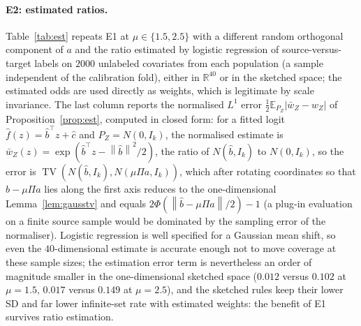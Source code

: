 \documentclass[11pt,a4paper]{article}
\newcommand{\norm}[1]{\left\|#1\right\|}
\newcommand{\E}{\mathbb{E}}
\newcommand{\R}{\mathbb{R}}
\newcommand{\TV}{\operatorname{TV}}
\theoremstyle{plain}
\theoremstyle{definition}
\theoremstyle{remark}
\begin{document}
\FloatBarrier
\paragraph{E2: estimated ratios.}
Table~\ref{tab:est} repeats E1 at $\mu\in\{1.5,2.5\}$ with a different random orthogonal component of $a$ and the ratio estimated by logistic regression of source-versus-target labels on $2000$ unlabeled covariates from each population (a sample independent of the calibration fold), either in $\R^{40}$ or in the sketched space; the estimated odds are used directly as weights, which is legitimate by scale invariance. The last column reports the normalised $L^1$ error $\tfrac12\E_{P_Z}|\bar w_Z-w_Z|$ of Proposition~\ref{prop:est}, computed in closed form: for a fitted logit $\hat f(z)=\hat b^{\!\top}z+\hat c$ and $P_Z=N(0,I_k)$, the normalised estimate is $\bar w_Z(z)=\exp(\hat b^{\!\top}z-\norm{\hat b}^2/2)$, the ratio of $N(\hat b,I_k)$ to $N(0,I_k)$, so the error is $\TV(N(\hat b,I_k),N(\mu\Pi a,I_k))$, which after rotating coordinates so that $\hat b-\mu\Pi a$ lies along the first axis reduces to the one-dimensional Lemma~\ref{lem:gausstv} and equals $2\Phi(\norm{\hat b-\mu\Pi a}/2)-1$ (a plug-in evaluation on a finite source sample would be dominated by the sampling error of the normaliser). Logistic regression is well specified for a Gaussian mean shift, so even the $40$-dimensional estimate is accurate enough not to move coverage at these sample sizes; the estimation error term is nevertheless an order of magnitude smaller in the one-dimensional sketched space ($0.012$ versus $0.102$ at $\mu=1.5$, $0.017$ versus $0.149$ at $\mu=2.5$), and the sketched rules keep their lower SD and far lower infinite-set rate with estimated weights: the benefit of E1 survives ratio estimation.
\end{document}
